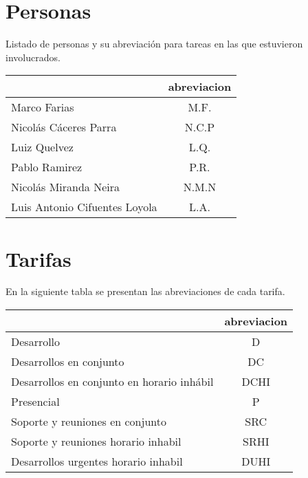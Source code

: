 \documentclass{article}
\begin{document}
\section{Personas}
Listado de personas y su abreviación para tareas en las que estuvieron involucrados.
\begin{table}[htbp]
    \centering
    \begin{tabular}{|p{6cm}|c|}
        \hline
        \centering{\textbf{Nombre}} & \textbf{abreviacion} \\ \hline
        Marco Farias &  \label{M.F.}M.F.  \\ \hline
        Nicolás Cáceres Parra &  \label{N.C.P}N.C.P  \\ \hline
        Luiz Quelvez &  \label{L.Q.}L.Q.  \\ \hline
        Pablo Ramirez &  \label{P.R.}P.R.  \\ \hline
        Nicolás Miranda Neira &  \label{N.M.N}N.M.N  \\ \hline
        Luis Antonio Cifuentes Loyola &  \label{L.A.}L.A.  \\ \hline
    \end{tabular}
\end{table} 
 
\section{Tarifas}
    En la siguiente tabla se presentan las abreviaciones de cada tarifa.
\begin{table}[htbp]
    \centering
    \begin{tabular}{|p{6cm}|c|}
        \hline
        \centering{\textbf{Nombre}} & \textbf{abreviacion} \\ \hline  Desarrollo &  \label{D}D  \\ \hline 
 Desarrollos en conjunto &  \label{DC}DC  \\ \hline 
 Desarrollos en conjunto en horario inhábil &  \label{DCHI}DCHI  \\ \hline 
 Presencial &  \label{P}P  \\ \hline 
 Soporte y reuniones en conjunto &  \label{SRC}SRC  \\ \hline 
 Soporte y reuniones horario inhabil &  \label{SRHI}SRHI  \\ \hline 
 Desarrollos urgentes horario inhabil &  \label{DUHI}DUHI  \\ \hline 

    \end{tabular}
\end{table} 
 
\end{document}
